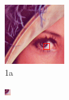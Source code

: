 \documentclass[pdftex,12pt,a4paper]{report}
\begin{document}

\begin{figure}[h]
\begin{subfigure}{.5\textwidth}
  \centering
  \includegraphics[width=.8\linewidth]{images/lenna_marked_small}
  \caption{1a}
  \label{fig:lennas1}
\end{subfigure}%
\begin{subfigure}{.5\textwidth}
  \centering
  \includegraphics[width=.8\linewidth]{images/lenna_small}

\end{subfigure}
\end{figure}
\end{document}
